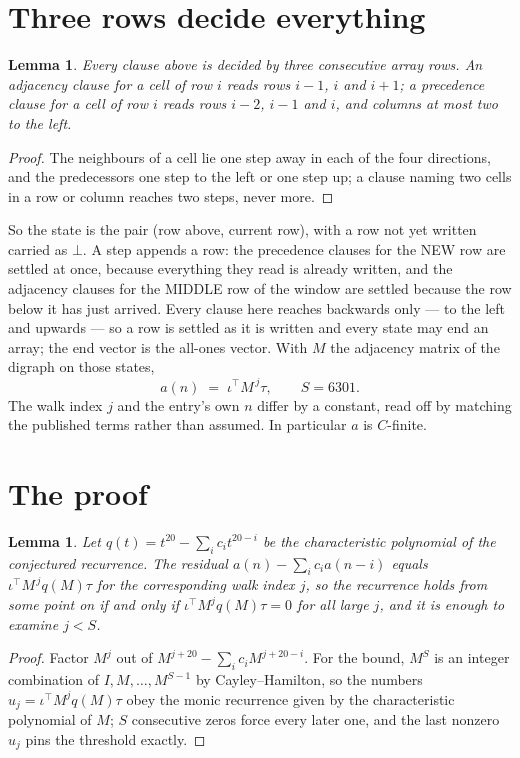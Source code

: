 \documentclass[11pt,a4paper]{article}
\theoremstyle{plain}
\newtheorem{lemma}[theorem]{Lemma}
\theoremstyle{definition}
\begin{document}
\section{Three rows decide everything}

\begin{lemma}\label{lem:win}
Every clause above is decided by three consecutive array rows. An adjacency clause for a cell
of row $i$ reads rows $i-1$, $i$ and $i+1$; a precedence clause for a cell of row $i$ reads
rows $i-2$, $i-1$ and $i$, and columns at most two to the left.
\end{lemma}

\begin{proof}
The neighbours of a cell lie one step away in each of the four directions, and the predecessors
one step to the left or one step up; a clause naming two cells in a row or column reaches two
steps, never more.
\end{proof}

So the state is the pair (row above, current row), with a row not yet written carried as
$\bot$. A step appends a row: the precedence clauses for the NEW row are settled at once,
because everything they read is already written, and the adjacency clauses for the MIDDLE row
of the window are settled because the row below it has just arrived. Every clause here reaches backwards only --- to the left and upwards --- so a
row is settled as it is written and every state may end an array; the end vector is the
all-ones vector. With $M$ the
adjacency matrix of the digraph on those states,
\[
a(n)\;=\;\iota^{\!\top}M^{\,j}\tau ,\qquad S=6301.
\]
The walk index $j$ and the entry's own $n$ differ by a constant, read off by matching the
published terms rather than assumed. In particular $a$ is $C$-finite.

\section{The proof}

\begin{lemma}\label{lem:crit}
Let $q(t)=t^{20}-\sum_i c_it^{20-i}$ be the characteristic polynomial of the
conjectured recurrence. The residual $a(n)-\sum_ic_ia(n-i)$ equals
$\iota^{\!\top}M^{\,j}q(M)\tau$ for the corresponding walk index $j$, so the recurrence
holds from some point on if and only if $\iota^{\!\top}M^{j}q(M)\tau=0$ for all large $j$,
and it is enough to examine $j<S$.
\end{lemma}

\begin{proof}
Factor $M^{j}$ out of $M^{j+20}-\sum_ic_iM^{j+20-i}$. For the bound, $M^{S}$
is an integer combination of $I,M,\dots,M^{S-1}$ by Cayley--Hamilton, so the numbers
$u_j=\iota^{\!\top}M^{j}q(M)\tau$ obey the monic recurrence given by the characteristic
polynomial of $M$; $S$ consecutive zeros force every later one, and the last nonzero $u_j$
pins the threshold exactly.
\end{proof}
\end{document}
